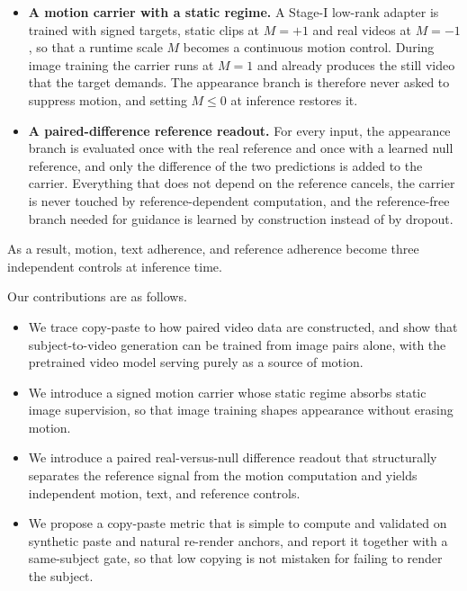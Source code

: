 \begin{itemize}
  \item \textbf{A motion carrier with a static regime.} A Stage-I low-rank adapter is trained with signed targets, static clips at $M{=}{+}1$ and real videos at $M{=}{-}1$, so that a runtime scale $M$ becomes a continuous motion control. During image training the carrier runs at $M{=}1$ and already produces the still video that the target demands. The appearance branch is therefore never asked to suppress motion, and setting $M{\le}0$ at inference restores it.
  \item \textbf{A paired-difference reference readout.} For every input, the appearance branch is evaluated once with the real reference and once with a learned null reference, and only the difference of the two predictions is added to the carrier. Everything that does not depend on the reference cancels, the carrier is never touched by reference-dependent computation, and the reference-free branch needed for guidance is learned by construction instead of by dropout.
\end{itemize}

As a result, motion, text adherence, and reference adherence become three independent controls at inference time.

Our contributions are as follows.

\begin{itemize}
  \item We trace copy-paste to how paired video data are constructed, and show that subject-to-video generation can be trained from image pairs alone, with the pretrained video model serving purely as a source of motion.
  \item We introduce a signed motion carrier whose static regime absorbs static image supervision, so that image training shapes appearance without erasing motion.
  \item We introduce a paired real-versus-null difference readout that structurally separates the reference signal from the motion computation and yields independent motion, text, and reference controls.
  \item We propose a copy-paste metric that is simple to compute and validated on synthetic paste and natural re-render anchors, and report it together with a same-subject gate, so that low copying is not mistaken for failing to render the subject.
\end{itemize}
